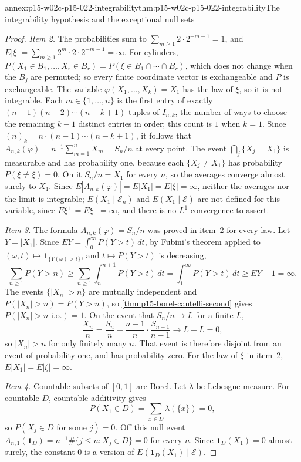 \begin{annexitem}{annex:p15-w02c-p15-022-integrability}{thm:p15-w02c-p15-022-integrability}{The integrability hypothesis and the exceptional null sets}
\begin{proof}
\emph{Item 2.} The probabilities sum to
\(\sum_{m\geq1}2\cdot2^{-m-1}=1\), and
\(E|\xi|=\sum_{m\geq1}2^m\cdot2\cdot2^{-m-1}=\infty\). For cylinders,
\(P(X_1\in B_1,\ldots,X_r\in B_r)=P(\xi\in B_1\cap\cdots\cap B_r)\),
which does not change when the \(B_j\) are permuted; so every finite
coordinate vector is exchangeable and \(P\) is exchangeable. The
variable \(\varphi(X_1,\ldots,X_k)=X_1\) has the law of \(\xi\), so it is
not integrable. Each \(m\in\{1,\ldots,n\}\) is the first entry of
exactly \((n-1)(n-2)\cdots(n-k+1)\) tuples of \(I_{n,k}\), the number of
ways to choose the remaining \(k-1\) distinct entries in order; this
count is \(1\) when \(k=1\). Since
\((n)_k=n\cdot(n-1)\cdots(n-k+1)\), it follows that
\(A_{n,k}(\varphi)=n^{-1}\sum_{m=1}^nX_m=S_n/n\) at every point. The
event \(\bigcap_{j}\{X_j=X_1\}\) is measurable and has probability one,
because each \(\{X_j\neq X_1\}\) has probability
\(P(\xi\neq\xi)=0\). On it \(S_n/n=X_1\) for every \(n\), so the
averages converge almost surely to \(X_1\). Since
\(E|A_{n,k}(\varphi)|=E|X_1|=E|\xi|=\infty\), neither the averages nor
the limit is integrable; \(E(X_1\mid\mathcal E_n)\) and
\(E(X_1\mid\mathcal E)\) are not defined for this variable, since
\(E\xi^+=E\xi^-=\infty\), and there is no \(L^1\) convergence to assert.

\emph{Item 3.} The formula \(A_{n,k}(\varphi)=S_n/n\) was proved in
item~2 for every law. Let \(Y=|X_1|\). Since
\(EY=\int_0^\infty P(Y>t)\,dt\), by Fubini's theorem applied to
\((\omega,t)\mapsto\mathbf1_{\{Y(\omega)>t\}}\), and \(t\mapsto P(Y>t)\) is decreasing,
\[
 \sum_{n\geq1}P(Y>n)\geq\sum_{n\geq1}\int_n^{n+1}P(Y>t)\,dt
   =\int_1^\infty P(Y>t)\,dt\geq EY-1=\infty.
\]
The events \(\{|X_n|>n\}\) are mutually independent and
\(P(|X_n|>n)=P(Y>n)\), so \cref{thm:p15-borel-cantelli-second} gives
\(P(|X_n|>n\text{ i.o.})=1\). On the event that \(S_n/n\to L\) for a
finite \(L\),
\[
 \frac{X_n}n=\frac{S_n}n-\frac{n-1}n\cdot\frac{S_{n-1}}{n-1}\longrightarrow L-L=0,
\]
so \(|X_n|>n\) for only finitely many \(n\). That event is therefore
disjoint from an event of probability one, and has probability zero.
For the law of \(\xi\) in item~2, \(E|X_1|=E|\xi|=\infty\).

\emph{Item 4.} Countable subsets of \([0,1]\) are Borel. Let \(\lambda\) be
Lebesgue measure. For countable \(D\), countable additivity gives
\[
 P(X_1\in D)=\sum_{x\in D}\lambda(\{x\})=0,
\]
so \(P(X_j\in D\text{ for some }j)=0\). Off this null
event \(A_{n,1}(\mathbf1_D)=n^{-1}\#\{j\leq n:X_j\in D\}=0\) for every
\(n\). Since \(\mathbf1_D(X_1)=0\) almost surely, the constant \(0\) is a
version of \(E(\mathbf1_D(X_1)\mid\mathcal E)\).


\end{proof}
\end{annexitem}
